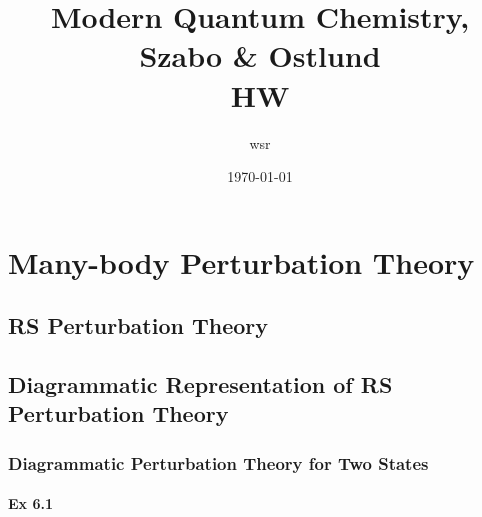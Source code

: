 \documentclass[a4paper]{article}
\title{\textbf{Modern Quantum Chemistry, Szabo \& Ostlund}\\HW}
\author{wsr
\vspace{5pt}\\
}
\date{\today} %
\newcommand{\ex}[1]{\paragraph{Ex #1}}
\numberwithin{equation}{subsection}
\begin{document}

\maketitle

\tableofcontents

\newpage

\setcounter{section}{5}

\section{Many-body Perturbation Theory}
\subsection{RS Perturbation Theory}

\subsection{Diagrammatic Representation of RS Perturbation Theory}
\subsubsection{Diagrammatic Perturbation Theory for Two States}
\ex{6.1}
~\\
\end{document}
